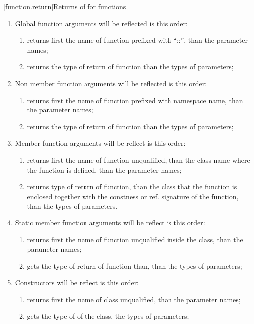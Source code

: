 [function.return]{Returns of  for functions}
\begin{enumerate} 
\item Global function arguments will be reflected is this order: 
\begin{enumerate}
\item {} returns first the name of function prefixed with ``::'', than the parameter names;
\item {} returns the type of return of function than the types of parameters; 
\end{enumerate}
\item Non member function arguments will be reflected is this order: 
\begin{enumerate}
\item {} returns first the name of function prefixed with namespace name, than the parameter names;
\item {} returns the type of return of function than the types of parameters; 
\end{enumerate}
\item Member function arguments will be reflect is this order:
\begin{enumerate}
\item {} returns first the name of function unqualified, than the class name where the function is defined, than the parameter names;
\item {} returns type of return of function, than the class that the function is enclosed together with the constness or ref. signature of the function, than the types of parameters.
\end{enumerate}
\item Static member function arguments will be reflect is this order:
\begin{enumerate}
\item {} returns first the name of function unqualified inside the class, than the parameter names; \item {} gets the type of return of function than, than the types of parameters;
\end{enumerate}
\item Constructors will be reflect is this order:
\begin{enumerate}
\item {} returns first the name of class unqualified, than the parameter names;
\item {} gets the type of of the class, the types of parameters;
\end{enumerate}


\end{enumerate}
